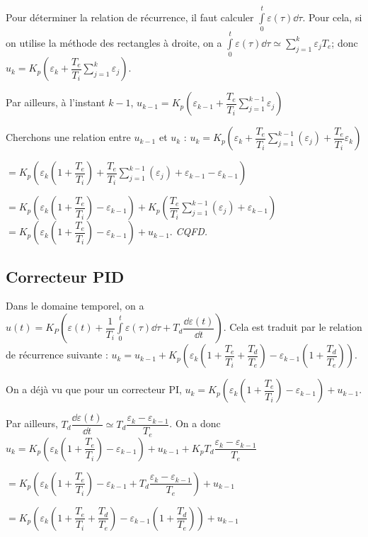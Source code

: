\begin{demo}
Pour déterminer la relation de récurrence, il faut calculer $\int\limits_0^t \varepsilon(\tau) \dd \tau$. 
Pour cela, si on utilise la méthode des rectangles à droite, on a 
$\int\limits_0^t \varepsilon(\tau) \dd \tau \simeq \sum\limits_{j=1}^k \varepsilon_j T_e$; donc 
$u_k = K_p\left(\varepsilon_k + \dfrac{T_e}{T_i}\sum\limits_{j=1}^k \varepsilon_j \right)$.

Par ailleurs, à l'instant $k-1$, $u_{k-1} = K_p\left(\varepsilon_{k-1} + \dfrac{T_e}{T_i}\sum\limits_{j=1}^{k-1} \varepsilon_j \right)$


Cherchons une relation entre $u_{k-1}$ et $u_{k}$ : 
$u_k = K_p\left(\varepsilon_k + \dfrac{T_e}{T_i}\sum\limits_{j=1}^{k-1} \left(\varepsilon_j \right) + \dfrac{T_e}{T_i} \varepsilon_k \right)$

$= K_p\left(\varepsilon_k \left(1+\dfrac{T_e}{T_i}\right)+ \dfrac{T_e}{T_i}\sum\limits_{j=1}^{k-1} \left(\varepsilon_j \right) + \varepsilon_{k-1} - \varepsilon_{k-1}\right)$

$= K_p\left(\varepsilon_k \left(1+\dfrac{T_e}{T_i}\right) - \varepsilon_{k-1}\right)
+ K_p\left(\dfrac{T_e}{T_i}\sum\limits_{j=1}^{k-1} \left(\varepsilon_j \right) + \varepsilon_{k-1} \right) $
$= K_p\left(\varepsilon_k \left(1+\dfrac{T_e}{T_i}\right) - \varepsilon_{k-1}\right) + u_{k-1} $. \textit{CQFD.}
\end{demo}


\subsection{Correcteur PID}
\begin{defi}

Dans le domaine temporel, on a $u(t)=K_P  \left(\varepsilon(t)+\dfrac{1}{T_i}\int\limits_0^t \varepsilon(\tau) \dd \tau +T_d \dfrac{\dd \varepsilon(t)}{\dd t}\right)$. Cela est traduit par le relation de récurrence suivante : 
$u_k = u_{k-1} + K_p \left( \varepsilon_k \left( 1+\dfrac{T_e}{T_i}+\dfrac{T_d}{T_e}\right) - \varepsilon_{k-1} \left( 1+\dfrac{T_d}{T_e}\right)\right)$.

\end{defi}

\begin{demo}
On a déjà vu que pour un correcteur PI, $u_k = K_p\left(\varepsilon_k \left(1+\dfrac{T_e}{T_i}\right) - \varepsilon_{k-1}\right) + u_{k-1} $.

Par ailleurs, $T_d  \dfrac{\dd \varepsilon(t)}{\dd t} \simeq T_d  \dfrac{\varepsilon_k -\varepsilon_{k-1}}{T_e}$. 
On a donc 
 $u_k = K_p\left(\varepsilon_k \left(1+\dfrac{T_e}{T_i}\right) - \varepsilon_{k-1}\right) + u_{k-1}  + K_p  T_d  \dfrac{\varepsilon_k -\varepsilon_{k-1}}{T_e} $
 

$= K_p\left(\varepsilon_k \left(1+\dfrac{T_e}{T_i}\right) - \varepsilon_{k-1} +  T_d  \dfrac{\varepsilon_k -\varepsilon_{k-1}}{T_e}\right) + u_{k-1}   $

$= K_p\left(\varepsilon_k \left(1+\dfrac{T_e}{T_i}+\dfrac{T_d}{T_e}\right) - \varepsilon_{k-1}\left( 1+\dfrac{T_d}{T_e}\right) \right) + u_{k-1}   $

\end{demo}


